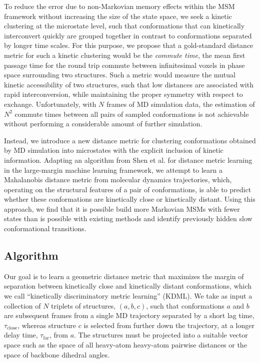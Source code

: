\documentclass[twocolumn,floatfix,nofootinbib,aps]{revtex4-1}
\begin{document}
To reduce the error due to non-Markovian memory effects within the MSM framework without increasing the size of the state space, we seek a kinetic clustering at the microstate level, such that conformations that can kinetically interconvert quickly are grouped together in contrast to conformations separated by longer time scales. For this purpose, we propose that a gold-standard distance metric for such a kinetic clustering would be the \emph{commute time}, the mean first passage time for the round trip commute between infinitesimal voxels in phase space surrounding two structures. Such a metric would measure the mutual kinetic accessibility of two structures, such that low distances are associated with rapid interconversion, while maintaining the proper symmetry with respect to exchange. Unfortunately, with $N$ frames of MD simulation data, the estimation of $N^2$ commute times between all pairs of sampled conformations is not achievable without performing a considerable amount of further simulation.

Instead, we introduce a new distance metric for clustering conformations obtained by MD simulation into microstates with the explicit inclusion of kinetic information. Adapting an algorithm from Shen et al. for distance metric learning in the large-margin machine learning framework,\cite{Shen:2010df} we attempt to learn a Mahalanobis distance metric from molecular dynamics trajectories, which, operating on the structural features of a pair of conformations, is able to predict whether these conformations are kinetically close or kinetically distant. Using this approach, we find that it is possible build more Markovian MSMs with fewer states than is possible with existing methods and identify previously hidden slow conformational transitions.

\subsection{Algorithm}

Our goal is to learn a geometric distance metric that maximizes the margin of separation between kinetically close and kinetically distant conformations, which we call ``kinetically discriminatory metric learning'' (KDML). We take as input a collection of $N$ triplets of structures, $(a, b, c)$, such that conformations $a$ and $b$ are subsequent frames from a single MD trajectory separated by a short lag time, $\tau_\mathrm{close}$, whereas structure $c$ is selected from further down the trajectory, at a longer delay time, $\tau_\mathrm{far}$, from $a$. The structures must be projected into a suitable vector space such as the space of all heavy-atom heavy-atom pairwise distances or the space of backbone dihedral angles.
\end{document}
